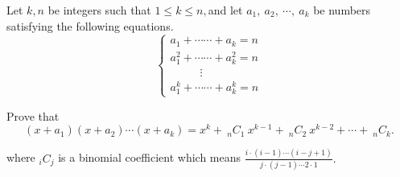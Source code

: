 Let $k,n$ be integers such that $1\leq k\leq n,$and let $a_1,\ a_2,\ \cdots,\ a_k$ be numbers satisfying the following equations.\[ \begin{cases} a_1+\cdots\cdots +a_k=n \\ a_1^2+\cdots\cdots +a_k^2=n\\ \ \ \ \ \ \ \ \ \ \ \ \ \vdots \\ a_1^k+\cdots\cdots +a_k^k=n \end{cases} \]

Prove that \[ (x+a_1)(x+a_2)\cdots(x+a_k)=x^k+\ _n C_1\ x^{k-1}+\ _nC_2\ x^{k-2}+\cdots+\ _nC_k.  \]

where $_iC_j$ is a binomial coefficient which means $\frac{i\cdot (i-1)\cdots(i-j+1)}{j\cdot (j-1)\cdots 2\cdot 1}.$